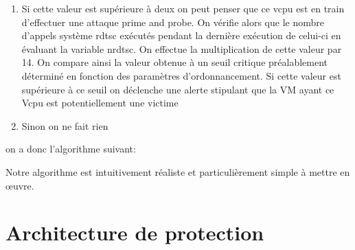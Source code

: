 \begin{enumerate}
 \item Si cette valeur est supérieure à deux on peut penser que ce vcpu est  en train d’effectuer une attaque prime and probe. On vérifie alors que le nombre d’appels système rdtsc exécutés pendant la dernière
  exécution de celui-ci en évaluant la variable nrdtsc. On effectue la multiplication de cette valeur par 14. On compare ainsi la valeur obtenue à un seuil critique préalablement déterminé en fonction des paramètres d’ordonnancement. Si cette valeur est supérieure à ce seuil on déclenche une alerte stipulant que  la VM ayant ce  Vcpu est potentiellement une victime
 \item Sinon on ne fait rien
\end{enumerate}
on a donc l'algorithme suivant:

 Notre algorithme est intuitivement réaliste et particulièrement simple à mettre en œuvre.

\section{Architecture de protection}

